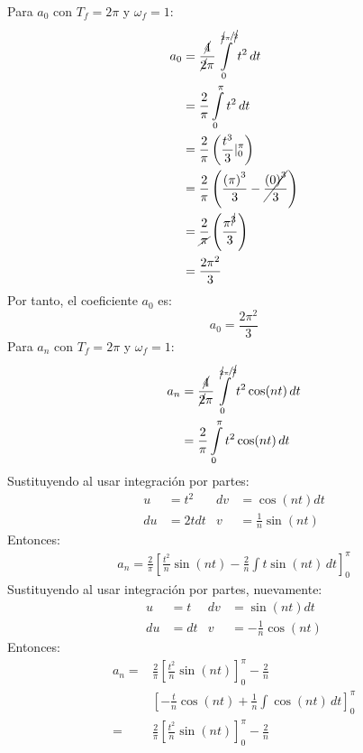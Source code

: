 \begin{multicols}{2}
Para $a_0$ con $T_f = 2 \pi$ y $\omega_f = 1$:
\begin{align*}
    a_0 &= \frac{\cancel{4}}{\cancel{2} \pi} \int\limits_{0}^{\sfrac{\cancel{2} \pi}{\cancel{2}}} t^{2} \,dt\\
    &= \frac{2}{\pi} \int\limits_{0}^{\pi} t^{2} \,dt\\
    &= \frac{2}{\pi} \left(\frac{t^{3}}{3} \vert_{0}^{\pi}\right)\\
    &= \frac{2}{\pi} \left(\frac{\left(\pi\right)^{3}}{3} - \cancel{\frac{\left(0\right)^{3}}{3}}\right)\\
    &= \frac{2}{\cancel{\pi}} \left(\frac{\pi^{\cancel{3}}}{3}\right)\\
    &= \frac{2\pi^{2}}{3}
\end{align*}
Por tanto, el coeficiente $a_0$ es:
\begin{equation}
    a_0 = \frac{2\pi^{2}}{3} \label{pro2:res1}
\end{equation}
Para $a_n$ con $T_f = 2 \pi$ y $\omega_f = 1$:
\begin{align*}
    a_n &= \frac{\cancel{4}}{\cancel{2} \pi} \int\limits_{0}^{\sfrac{\cancel{2} \pi}{\cancel{2}}} t^{2} \cos(nt) \,dt\\
    &= \frac{2}{\pi} \int\limits_{0}^{\pi} t^{2} \cos(nt) \,dt\\
\end{align*}
Sustituyendo al usar integración por partes:
\begin{align*}
    u&=t^{2}           &  dv&=\cos\left(nt\right) dt\\
    du&=2tdt         &  v&=\frac{1}{n} \sin\left(nt\right)
\end{align*}
Entonces:
\begin{align*}
    a_n = \frac{2}{\pi} \left[\frac{t^{2}}{n}\sin(nt) - \frac{2}{n} \int t \sin(nt) \,dt \right]_{0}^{\pi}
\end{align*}
Sustituyendo al usar integración por partes, nuevamente:
\begin{align*}
    u&=t          &  dv&=\sin\left(nt\right) dt\\
    du&=dt         &  v&=-\frac{1}{n} \cos\left(nt\right)
\end{align*}
Entonces:
\begin{align*}
    a_n =& \frac{2}{\pi} \left[\frac{t^{2}}{n}\sin(nt)\right]_{0}^{\pi} - \frac{2}{n}\\
    &\left[-\frac{t}{n}\cos(nt) + \frac{1}{n} \int \cos(nt) \,dt \right]_{0}^{\pi}\\
    =& \frac{2}{\pi} \left[\frac{t^{2}}{n}\sin(nt)\right]_{0}^{\pi} - \frac{2}{n}\\ 

\end{align*}
\end{multicols}
